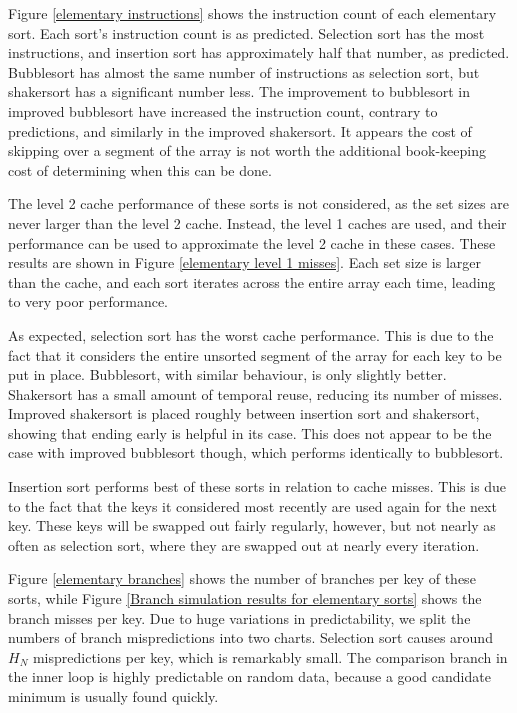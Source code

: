Figure \ref{elementary instructions} shows the instruction count of each
elementary sort. Each sort's instruction count is as predicted. Selection sort
has the most instructions, and insertion sort has approximately half that
number, as predicted. Bubblesort has almost the same number of instructions as
selection sort, but shakersort has a significant number less. The improvement to
bubblesort in improved bubblesort have increased the instruction count, contrary to
predictions, and similarly in the improved shakersort. It appears the cost of
skipping over a segment of the array is not worth the additional book-keeping
cost of determining when this can be done.

The level 2 cache performance of these sorts is not considered, as the set sizes
are never larger than the level 2 cache. Instead, the level 1 caches are used,
and their performance can be used to approximate the level 2 cache in these
cases. These results are shown in Figure \ref{elementary level 1 misses}. Each
set size is larger than the cache, and each sort iterates across the entire
array each time, leading to very poor performance.

As expected, selection sort has the worst cache performance. This is due to the
fact that it considers the entire unsorted segment of the array for each key to
be put in place. Bubblesort, with similar behaviour, is only slightly better.
Shakersort has a small amount of temporal reuse, reducing its number of misses.
Improved shakersort is placed roughly between insertion sort and shakersort,
showing that ending early is helpful in its case. This does not appear to be the
case with improved bubblesort though, which performs identically to bubblesort.

Insertion sort performs best of these sorts in relation to cache misses. This
is due to the fact that the keys it considered most recently are used again for
the next key. These keys will be swapped out fairly regularly, however, but not
nearly as often as selection sort, where they are swapped out at nearly every
iteration.

Figure \ref{elementary branches} shows the number of branches per key of these
sorts, while Figure \ref{Branch simulation results for elementary sorts} shows
the branch misses per key. Due to huge variations in predictability, we split
the numbers of branch mispredictions into two charts. Selection sort causes
around $H_N$ mispredictions per key, which is remarkably small. The comparison
branch in the inner loop is highly predictable on random data, because a good
candidate minimum is usually found quickly.

